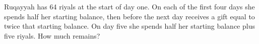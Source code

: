 Ruqayyah has 64 riyals at the start of day one. On each of the first four days she spends half her starting balance, then before the next day receives a gift equal to twice that starting balance. On day five she spends half her starting balance plus five riyals. How much remains?
